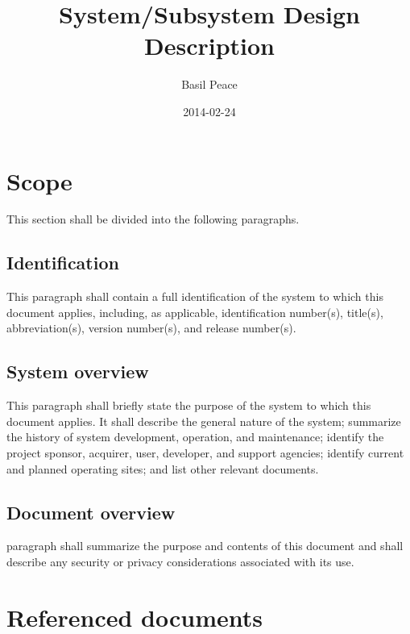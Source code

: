 \documentclass{fidata-report-template}
\begin{document}
\frontmatter

\title{System/Subsystem Design Description}

\date{2014-02-24}

\author{Basil Peace}

\maketitle
\tableofcontents

\section{Scope}

This section shall be divided into the following paragraphs.

\subsection{Identification}

This paragraph shall contain a full identification of the system to
which this document applies, including, as applicable, identification
number(s), title(s), abbreviation(s), version number(s), and release
number(s).

\subsection{System overview}

This paragraph shall briefly state the purpose of the system to which
this document applies. It shall describe the general nature of the
system; summarize the history of system development, operation, and
maintenance; identify the project sponsor, acquirer, user, developer,
and support agencies; identify current and planned operating sites; and
list other relevant documents.

\subsection{Document overview}

paragraph shall summarize the purpose and contents of this document and
shall describe any security or privacy considerations associated with
its use.

\section{Referenced documents}
\end{document}
